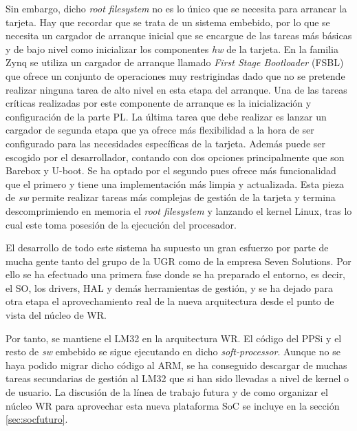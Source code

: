 

Sin embargo, dicho \textit{root filesystem} no es lo único que se necesita para 
arrancar la tarjeta. Hay que recordar que se trata de un sistema embebido, por 
lo que se necesita un cargador de arranque inicial que se encargue de las 
tareas más básicas y de bajo nivel como inicializar los componentes \textit{hw} 
de la tarjeta. En la familia Zynq se utiliza un cargador de arranque llamado 
\textit{First Stage Bootloader} (FSBL) que ofrece un conjunto de operaciones 
muy restrigindas dado que no se pretende realizar ninguna tarea de alto nivel 
en esta etapa del arranque. Una de las tareas críticas realizadas por este 
componente de arranque es la inicialización y configuración de la parte PL. La 
última tarea que debe realizar es lanzar un cargador de segunda etapa que ya 
ofrece más flexibilidad a la hora de ser configurado para las necesidades 
específicas de la tarjeta. Además puede ser escogido por el desarrollador, 
contando con dos opciones principalmente que son Barebox y U-boot. Se ha optado 
por el segundo pues ofrece más funcionalidad que el primero y tiene una 
implementación más limpia y actualizada. Esta pieza de \textit{sw} permite 
realizar tareas más complejas de gestión de la tarjeta y termina 
descomprimiendo en memoria el \textit{root filesystem} y lanzando el kernel 
Linux, tras lo cual este toma posesión de la ejecución del procesador.

El desarrollo de todo este sistema ha supuesto un gran esfuerzo por parte de 
mucha gente tanto del grupo de la UGR como de la empresa Seven Solutions. Por 
ello se ha efectuado una primera fase donde se ha preparado el entorno, es 
decir, el SO, los drivers, HAL y demás herramientas de gestión, y se ha dejado 
para otra etapa el aprovechamiento real de la nueva arquitectura desde el punto 
de vista del núcleo de WR.

Por tanto, se mantiene el LM32 en la arquitectura WR. El código del PPSi y el 
resto de \textit{sw} embebido se sigue ejecutando en dicho 
\textit{soft-processor}. Aunque no se haya podido migrar dicho código al ARM, 
se ha conseguido descargar de muchas tareas secundarias de gestión al LM32 que 
si han sido llevadas a nivel de kernel o de usuario. La discusión de la línea 
de trabajo futura y de como organizar el núcleo WR para aprovechar esta nueva 
plataforma SoC se incluye en la sección \ref{sec:socfuturo}.

